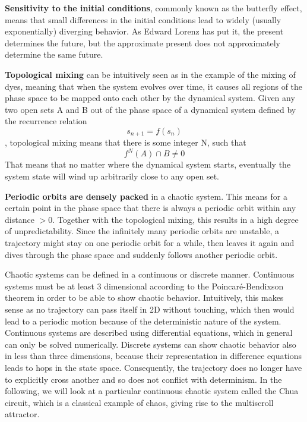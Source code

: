 \documentclass[main]{subfiles}
\begin{document}
\textbf{Sensitivity to the initial conditions}, commonly known as the butterfly effect, means that small differences in the initial conditions lead to widely (usually exponentially) diverging behavior. %
%
As Edward Lorenz has put it, the present determines the future, but the approximate present does not approximately determine the same future.

\textbf{Topological mixing} can be intuitively seen as in the example of the mixing of dyes, meaning that when the system evolves over time, it causes all regions of the phase space to be mapped onto each other by the dynamical system. %
%
Given any two open sets A and B out of the phase space of a dynamical system defined by the recurrence relation \[s_{n+1} = f(s_n)\], topological mixing means that there is some integer N, such that \[f^N(A) \cap B \neq 0\] %
%
That means that no matter where the dynamical system starts, eventually the system state will wind up arbitrarily close to any open set.

\textbf{Periodic orbits are densely packed} in a chaotic system. %
%
This means for a certain point in the phase space that there is always a periodic orbit within any distance \(> 0\). %
%
Together with the topological mixing, this results in a high degree of unpredictability. %
%
Since the infinitely many periodic orbits are unstable, a trajectory might stay on one periodic orbit for a while, then leaves it again and dives through the phase space and suddenly follows another periodic orbit.

Chaotic systems can be defined in a continuous or discrete manner. %
%
Continuous systems must be at least 3 dimensional according to the Poincaré-Bendixson theorem \cite{bib:Bendixon1901} in order to be able to show chaotic behavior. %
%
Intuitively, this makes sense as no trajectory can pass itself in 2D without touching, which then would lead to a periodic motion because of the deterministic nature of the system. %
%
Continuous systems are described using differential equations, which in general can only be solved numerically. %
%
Discrete systems can show chaotic behavior also in less than three dimensions, because their representation in difference equations leads to hops in the state space. %
%
Consequently, the trajectory does no longer have to explicitly cross another and so does not conflict with determinism. %
%
In the following, we will look at a particular continuous chaotic system called the Chua circuit, which is a classical example of chaos, giving rise to the multiscroll attractor.
\end{document}
